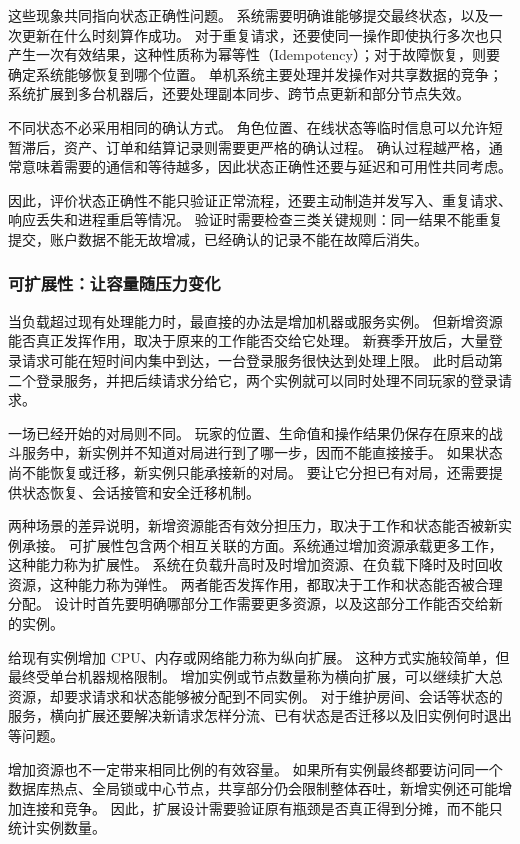 这些现象共同指向状态正确性问题。
系统需要明确谁能够提交最终状态，以及一次更新在什么时刻算作成功。
对于重复请求，还要使同一操作即使执行多次也只产生一次有效结果，这种性质称为幂等性（Idempotency）；对于故障恢复，则要确定系统能够恢复到哪个位置。
单机系统主要处理并发操作对共享数据的竞争；系统扩展到多台机器后，还要处理副本同步、跨节点更新和部分节点失效。

不同状态不必采用相同的确认方式。
角色位置、在线状态等临时信息可以允许短暂滞后，资产、订单和结算记录则需要更严格的确认过程。
确认过程越严格，通常意味着需要的通信和等待越多，因此状态正确性还要与延迟和可用性共同考虑。

因此，评价状态正确性不能只验证正常流程，还要主动制造并发写入、重复请求、响应丢失和进程重启等情况。
验证时需要检查三类关键规则：同一结果不能重复提交，账户数据不能无故增减，已经确认的记录不能在故障后消失。

\subsubsection{可扩展性：让容量随压力变化}\label{sec1:scalability-goal}

当负载超过现有处理能力时，最直接的办法是增加机器或服务实例。
但新增资源能否真正发挥作用，取决于原来的工作能否交给它处理。
新赛季开放后，大量登录请求可能在短时间内集中到达，一台登录服务很快达到处理上限。
此时启动第二个登录服务，并把后续请求分给它，两个实例就可以同时处理不同玩家的登录请求。

一场已经开始的对局则不同。
玩家的位置、生命值和操作结果仍保存在原来的战斗服务中，新实例并不知道对局进行到了哪一步，因而不能直接接手。
如果状态尚不能恢复或迁移，新实例只能承接新的对局。
要让它分担已有对局，还需要提供状态恢复、会话接管和安全迁移机制。

两种场景的差异说明，新增资源能否有效分担压力，取决于工作和状态能否被新实例承接。
可扩展性包含两个相互关联的方面。系统通过增加资源承载更多工作，这种能力称为扩展性。
系统在负载升高时及时增加资源、在负载下降时及时回收资源，这种能力称为弹性。
两者能否发挥作用，都取决于工作和状态能否被合理分配。
设计时首先要明确哪部分工作需要更多资源，以及这部分工作能否交给新的实例。

给现有实例增加 CPU、内存或网络能力称为纵向扩展。
这种方式实施较简单，但最终受单台机器规格限制。
增加实例或节点数量称为横向扩展，可以继续扩大总资源，却要求请求和状态能够被分配到不同实例。
对于维护房间、会话等状态的服务，横向扩展还要解决新请求怎样分流、已有状态是否迁移以及旧实例何时退出等问题。

增加资源也不一定带来相同比例的有效容量。
如果所有实例最终都要访问同一个数据库热点、全局锁或中心节点，共享部分仍会限制整体吞吐，新增实例还可能增加连接和竞争。
因此，扩展设计需要验证原有瓶颈是否真正得到分摊，而不能只统计实例数量。

